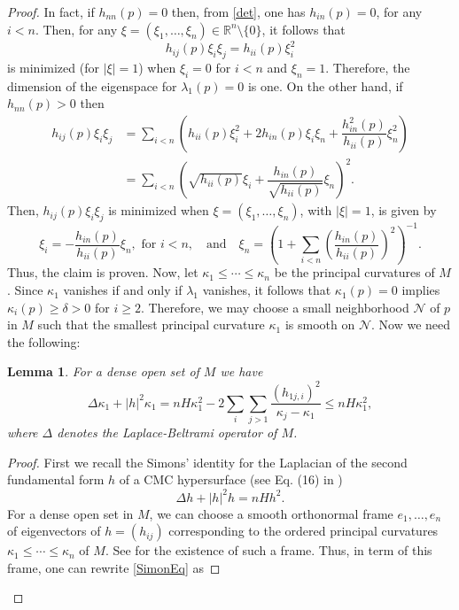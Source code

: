 \documentclass[11pt]{amsart}
\theoremstyle{plain}
\newtheorem{lemma}[theorem]{Lemma}
\numberwithin{equation}{section}
\numberwithin{theorem}{section}
\begin{document}
\begin{proof}
In fact, if $h_{nn}(p)=0$ then, from \eqref{det}, one has $h_{in}(p)=0$, for any $i<n$. Then, for any $\xi=(\xi_1, \ldots ,\xi_n)\in \mathbb{R}^n\setminus\{0\}$, it follows that 
\begin{equation*}
	h_{ij}(p)\xi_i\xi_j =h_{ii}(p)\xi_i^2
\end{equation*}
is minimized (for $|\xi|=1$) when $\xi_i=0$ for $i<n$ and $\xi_n=1$. Therefore, the dimension of the eigenspace for $\lambda_1(p)=0$ is one. On the other hand,  if $h_{nn}(p)>0$ then
\begin{align*}
h_{ij}(p)\xi_i\xi_j & =\sum_{i<n}\left(h_{ii}(p)\xi_i^2+2h_{in}(p)\xi_i\xi_n+\dfrac{h_{in}^2(p)}{h_{ii}(p)}\xi_n^2\right) \\
	& =\sum_{i<n} \left(\sqrt{h_{ii}(p)}\xi_i+ \dfrac{h_{in}(p)}{\sqrt{h_{ii}(p)}}\xi_n \right)^2.
\end{align*}
Then, $ h_{ij}(p)\xi_i\xi_j$ is minimized when $\xi=(\xi_1,\ldots,\xi_n)$, with $|\xi|=1$, is given by
\begin{equation*}
	\xi_i=-\dfrac{h_{in}(p)}{h_{ii}(p)}\xi_n, \textrm{ for } i<n,\quad \textrm{and} \quad 	\xi_n=\left(1+\sum_{i<n}\left(\dfrac{h_{in}(p)}{h_{ii}(p)}\right)^2\right)^{-1} . 
\end{equation*}
Thus, the claim is proven. Now, let $\kappa_1\leq\cdots\leq  \kappa_n$ be the principal curvatures of $M$. Since $\kappa_1$ vanishes if and only if $\lambda_1$ vanishes, it follows that $\kappa_1(p)=0$ implies $\kappa_i(p)\geq \delta>0$ for $i\geq 2$. Therefore, we may choose  a small neighborhood $\mathcal{N}$ of $p$ in $M$  such that the smallest principal curvature $\kappa_1$ is smooth on $\mathcal{N}$. Now we need the following:
\begin{lemma}
	For a dense open set of $M$ we have
	\begin{equation}
		\label{EQ1}
\Delta \kappa_1 +|h|^2\kappa_1=nH\kappa_1^2-2\sum_{i}\sum_{j>1}\dfrac{(h_{1j,i})^2}{\kappa_j-\kappa_1}\leq nH\kappa_1^2,
	\end{equation}
where $\Delta$ denotes the Laplace-Beltrami operator of $M$.
\end{lemma}
\begin{proof}
	First we recall the Simons' identity for the Laplacian of the second fundamental form $h$ of a CMC hypersurface  (see Eq. (16) in \cite{KB})
	\begin{equation}
		\label{SimonEq}
		\Delta h+|h|^2h=nH h^2.
	\end{equation}
For a dense open set in $M$, we can choose a smooth orthonormal frame $e_1, \ldots,e_n$ of eigenvectors of $h=(h_{ij})$ corresponding to the ordered principal curvatures $\kappa_1\leq \cdots\leq  \kappa_n$ of $M$. See \cite{Sing} for the existence of such a frame. Thus, in term of this frame, one can rewrite \eqref{SimonEq} as

\end{proof}
\end{proof}
\end{document}

